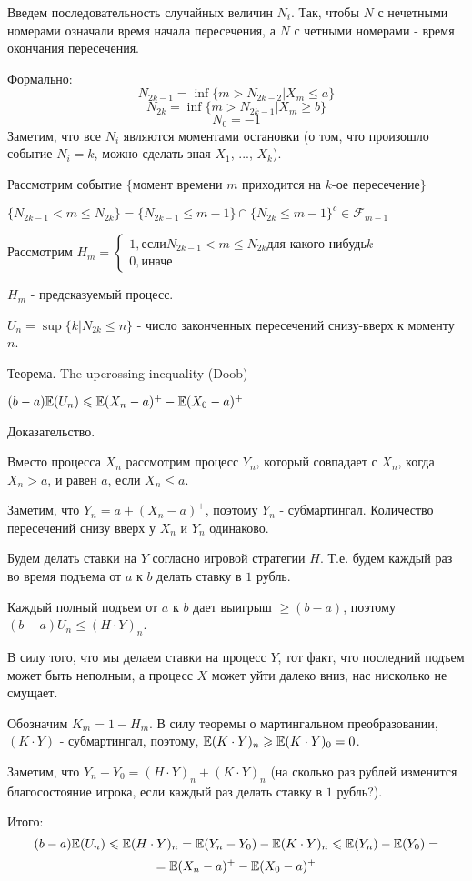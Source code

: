 {Введем последовательность случайных величин $N_{i}$. Так, чтобы
$N$ с нечетными номерами означали время начала пересечения, а $N$
с четными номерами - время окончания пересечения. \par
Формально:
$$
N_{2k-1}=\inf \{m>N_{2k-2}|X_{m}\le a\} $$
$$ N_{2k}=\inf
\{m>N_{2k-1}|X_{m}\ge b\} $$
$$
N_{0}=-1
$$
Заметим, что все $N_{i}$ являются моментами остановки (о том, что
произошло событие $N_{i}=k$, можно сделать зная $X_{1}$, ...,
$X_{k}$). \par
Рассмотрим событие $\{$момент времени $m$ приходится на $k$-ое
пересечение$\}$ \par
$\{N_{2k-1}<m\le N_{2k}\}=\{N_{2k-1}\le m-1 \}\cap\{N_{2k}\le
m-1\}^{c} \in \mathcal{F}_{m-1}$ \par
Рассмотрим $H_{m}= \left\{
\begin{array}{rcl}
1, \text{если} N_{2k-1}<m\le N_{2k} \text{для какого-нибудь} k \\
0, \text{иначе}
\end{array}
\right. $ \par
$H_{m}$ - предсказуемый процесс. \par
$U_{n}=\sup \{k|N_{2k}\le n\}$ - число законченных пересечений
снизу-вверх к моменту $n$. \par
Теорема. The upcrossing inequality (Doob) \par
$(b-a)\mathbb{E}(U_{n})\leqslant \mathbb{E}(X_{n}-a)^{+}-\mathbb{E}(X_{0}-a)^{+}$ \par
Доказательство. \par
Вместо процесса $X_{n}$ рассмотрим процесс $Y_{n}$, который
совпадает с $X_{n}$, когда $X_{n}>a$, и равен $a$, если $X_{n}\le
a$. \par
Заметим, что $Y_{n}=a+(X_{n}-a)^{+}$, поэтому $Y_{n}$ -
субмартингал. Количество пересечений снизу вверх у $X_{n}$ и $Y_{n}$ одинаково. \par
Будем делать ставки на $Y$ согласно игровой стратегии $H$. Т.е.
будем каждый раз во время подъема от $a$ к $b$ делать ставку в $1$
рубль. \par
Каждый полный подъем от $a$ к $b$ дает выигрыш $\ge (b-a)$,
поэтому $(b-a)U_{n}\le (H\cdot Y)_{n}$. \par
В силу того, что мы делаем ставки на процесс $Y$, тот факт, что
последний подъем может быть неполным, а процесс $X$ может уйти
далеко вниз, нас нисколько не смущает. \par
Обозначим $K_{m}=1-H_{m}$. В силу теоремы о мартингальном
преобразовании, $(K\cdot Y)$
- субмартингал, поэтому, $\mathbb{E}(K\cdot Y)_{n} \geqslant \mathbb{E}(K\cdot Y)_{0}=0$.\par
Заметим, что $Y_{n}-Y_{0}=(H\cdot Y)_{n}+(K\cdot Y)_{n}$ (на
сколько раз рублей изменится благосостояние игрока, если каждый
раз делать ставку в $1$ рубль?). \par
Итого:
$$
(b-a)\mathbb{E}(U_{n})\leqslant \mathbb{E}(H\cdot Y)_{n} = \mathbb{E}(Y_{n}-Y_{0})-\mathbb{E}(K\cdot Y)_{n}
\leqslant \mathbb{E}(Y_{n})-\mathbb{E}(Y_{0})=$$ $$ =\mathbb{E}(X_{n}-a)^{+}-\mathbb{E}(X_{0}-a)^{+}
$$

}
